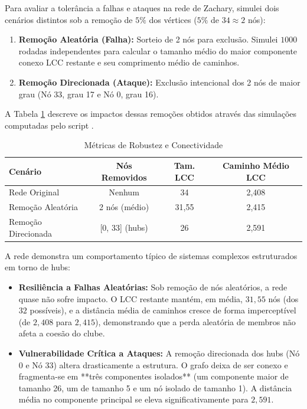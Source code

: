 \documentclass[sigconf]{webmedia}
\begin{document}
Para avaliar a tolerância a falhas e ataques na rede de Zachary, simulei dois cenários distintos sob a remoção de $5\%$ dos vértices ($5\%$ de $34 \approx 2$ nós):
\begin{enumerate}
    \item \textbf{Remoção Aleatória (Falha):} Sorteio de 2 nós para exclusão. Simulei $1000$ rodadas independentes para calcular o tamanho médio do maior componente conexo LCC restante e seu comprimento médio de caminhos.
    \item \textbf{Remoção Direcionada (Ataque):} Exclusão intencional dos 2 nós de maior grau (Nó 33, grau 17 e Nó 0, grau 16).
\end{enumerate}

A Tabela \ref{tab:robustness} descreve os impactos dessas remoções obtidos através das simulações computadas pelo script .

\begin{table}[h]
  \caption{Métricas de Robustez e Conectividade}
  \label{tab:robustness}
  \begin{tabular}{lccc}
    \toprule
    Cenário & Nós Removidos & Tam. LCC & Caminho Médio LCC \\
    \midrule
    Rede Original & Nenhum & 34 & 2,408 \\
    Remoção Aleatória & 2 nós (médio) & 31,55 & 2,415 \\
    Remoção Direcionada & [0, 33] (hubs) & 26 & 2,591 \\
    \bottomrule
  \end{tabular}
\end{table}

A rede demonstra um comportamento típico de sistemas complexos estruturados em torno de hubs:
\begin{itemize}
    \item \textbf{Resiliência a Falhas Aleatórias:} Sob remoção de nós aleatórios, a rede quase não sofre impacto. O LCC restante mantém, em média, $31,55$ nós (dos $32$ possíveis), e a distância média de caminhos cresce de forma imperceptível (de $2,408$ para $2,415$), demonstrando que a perda aleatória de membros não afeta a coesão do clube.
    \item \textbf{Vulnerabilidade Crítica a Ataques:} A remoção direcionada dos hubs (Nó 0 e Nó 33) altera drasticamente a estrutura. O grafo deixa de ser conexo e fragmenta-se em **três componentes isolados** (um componente maior de tamanho 26, um de tamanho 5 e um nó isolado de tamanho 1). A distância média no componente principal se eleva significativamente para $2,591$.
\end{itemize}
\end{document}
